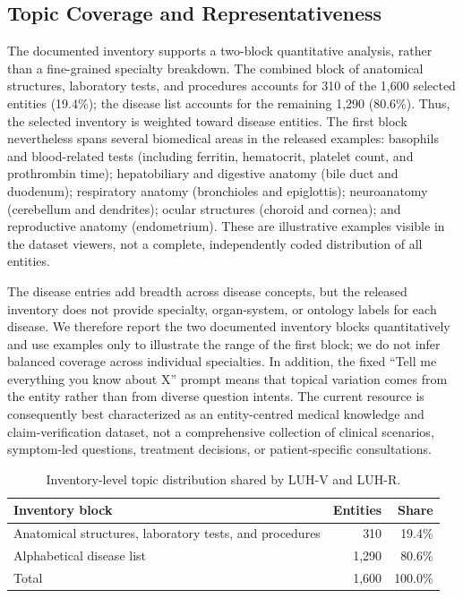 \documentclass[conference,a4paper]{IEEEtran}
\begin{document}
\subsection{Topic Coverage and Representativeness}
The documented inventory supports a two-block quantitative analysis, rather than a fine-grained specialty breakdown. The combined block of anatomical structures, laboratory tests, and procedures accounts for 310 of the 1,600 selected entities (19.4\%); the disease list accounts for the remaining 1,290 (80.6\%). Thus, the selected inventory is weighted toward disease entities. The first block nevertheless spans several biomedical areas in the released examples: basophils and blood-related tests (including ferritin, hematocrit, platelet count, and prothrombin time); hepatobiliary and digestive anatomy (bile duct and duodenum); respiratory anatomy (bronchioles and epiglottis); neuroanatomy (cerebellum and dendrites); ocular structures (choroid and cornea); and reproductive anatomy (endometrium). These are illustrative examples visible in the dataset viewers, not a complete, independently coded distribution of all entities.

The disease entries add breadth across disease concepts, but the released inventory does not provide specialty, organ-system, or ontology labels for each disease. We therefore report the two documented inventory blocks quantitatively and use examples only to illustrate the range of the first block; we do not infer balanced coverage across individual specialties. In addition, the fixed ``Tell me everything you know about X'' prompt means that topical variation comes from the entity rather than from diverse question intents. The current resource is consequently best characterized as an entity-centred medical knowledge and claim-verification dataset, not a comprehensive collection of clinical scenarios, symptom-led questions, treatment decisions, or patient-specific consultations.

\begin{table}[ht]
\centering
\small
\caption{Inventory-level topic distribution shared by LUH-V and LUH-R.}
\label{tab:topiccoverage}
\begin{tabular}{p{}rr}
\toprule
\textbf{Inventory block} & \textbf{Entities} & \textbf{Share} \\
\midrule
Anatomical structures, laboratory tests, and procedures & 310 & 19.4\% \\
Alphabetical disease list & 1,290 & 80.6\% \\
\midrule
Total & 1,600 & 100.0\% \\
\bottomrule
\end{tabular}
\end{table}
\end{document}
